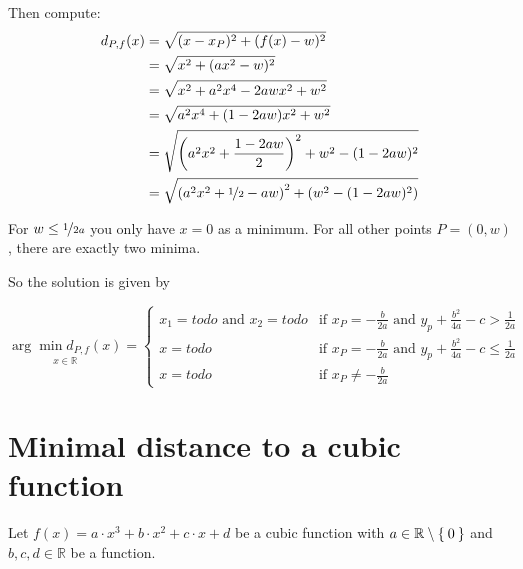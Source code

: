 \documentclass[a4paper]{scrartcl}
\theoremstyle{break}
\def\mdr{\ensuremath{\mathbb{R}}}
\theoremstyle{nonumberplain}
\def\mdr{\ensuremath{\mathbb{R}}}
\begin{document}
Then compute:
\begin{align}
  d_{P,f}(x)  &= \sqrt{(x-x_{P})^2 + (f(x)-w)^2}\\
    &= \sqrt{x^2 + (ax^2-w)^2}\\
    &= \sqrt{x^2 + a^2 x^4-2aw x^2+w^2}\\
    &= \sqrt{a^2 x^4 + (1-2aw) x^2 + w^2}\\
    &= \sqrt{\left (a^2 x^2 + \frac{1-2 a w}{2} \right )^2 + w^2 - (1-2 a w)^2}\\
    &= \sqrt{\left (a^2 x^2 + \nicefrac{1}{2}-a w \right )^2 + (w^2 - (1-2 a w)^2)}\\
\end{align}

For $w \leq \nicefrac{1}{2a}$ you only have $x = 0$ as a minimum.
For all other points $P = (0, w)$, there are exactly two minima.

So the solution is given by

\[\underset{x\in\mdr}{\arg \min d_{P,f}(x)} = \begin{cases}
     x_1 = todo \text{ and } x_2 = todo   &\text{if } x_P = - \frac{b}{2a} \text{ and } y_p + \frac{b^2}{4a} - c >  \frac{1}{2a} \\
     x = todo   &\text{if } x_P = - \frac{b}{2a} \text{ and } y_p + \frac{b^2}{4a} - c \leq  \frac{1}{2a} \\
     x = todo   &\text{if } x_P \neq - \frac{b}{2a}
    \end{cases}\]

\clearpage
\section{Minimal distance to a cubic function}
Let $f(x) = a \cdot x^3 + b \cdot x^2 + c \cdot x + d$ be a cubic function
with $a \in \mdr \setminus \Set{0}$ and 
$b, c, d \in \mdr$ be a function.
\end{document}

